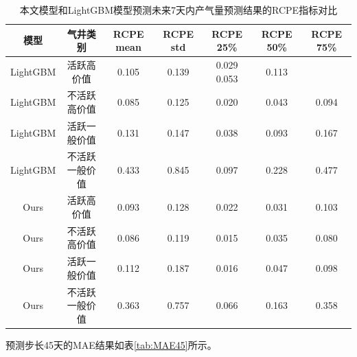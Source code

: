 \begin{table}[H]
    \renewcommand{\arraystretch}{1.5}
    \centering
    \caption{本文模型和LightGBM模型预测未来7天内产气量预测结果的RCPE指标对比}
    \label{tab:RCPE7}
    \begin{tabular}{|c|c|c|c|c|c|c|} %
    \hline
    模型     & 气井类别 & RCPE mean & RCPE std & RCPE 25\% & RCPE 50\% & RCPE 75\% \\ \hline
    LightGBM & 活跃高价值        &0.105     & 0.139     &0.029      0.053       &0.113 \\ \hline
    LightGBM & 不活跃高价值      & 0.085     & 0.125    & 0.020     & 0.043     & 0.094     \\ \hline
    LightGBM & 活跃一般价值     & 0.131     & 0.147    & 0.038     & 0.093     & 0.167     \\ \hline
    LightGBM & 不活跃一般价值      & 0.433     & 0.845    & 0.097     & 0.228     & 0.477     \\ \hline
    Ours      &活跃高价值         &0.093     & 0.128     &0.022      & 0.031      &0.103 \\ \hline
    Ours      & 不活跃高价值      & 0.086     & 0.119    & 0.015     & 0.035     & 0.080     \\ \hline
    Ours      & 活跃一般价值     & 0.112     & 0.187    & 0.016     & 0.047     & 0.098     \\ \hline
    Ours      & 不活跃一般价值      & 0.363     & 0.757    & 0.066     & 0.163     & 0.358     \\ \hline
    \end{tabular}
\end{table}
预测步长45天的MAE结果如表\ref{tab:MAE45}所示。
